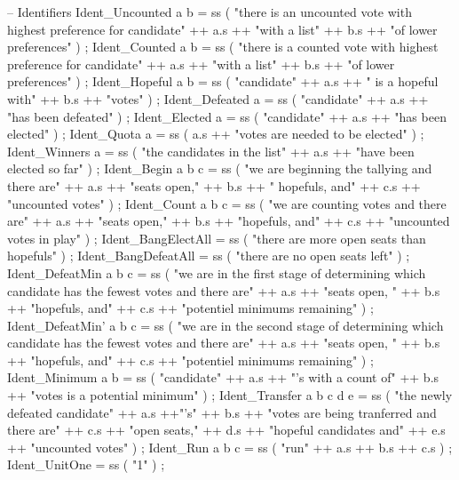 \begin{lstgf}
{        -- Identifiers
        Ident_Uncounted a b
            = ss ( "there is an uncounted vote with highest preference for candidate" ++ a.s ++ "with 
                      a list" ++ b.s ++ "of lower preferences" ) ;
        Ident_Counted a b
            = ss ( "there is a counted vote with highest preference for candidate" ++ a.s ++ "with a 
                      list" ++ b.s ++ "of lower preferences" ) ;
        Ident_Hopeful a b
            = ss ( "candidate" ++ a.s ++ " is a hopeful with" ++ b.s ++ "votes" ) ;
        Ident_Defeated a
            = ss ( "candidate" ++ a.s ++ "has been defeated" ) ;
        Ident_Elected a
            = ss ( "candidate" ++ a.s ++ "has been elected" ) ;
        Ident_Quota a
            = ss ( a.s ++ "votes are needed to be elected" ) ;
        Ident_Winners a
            = ss ( "the candidates in the list" ++ a.s ++ "have been elected so far" ) ;
        Ident_Begin a b c
            = ss ( "we are beginning the tallying and there are" ++ a.s ++ "seats open," ++ b.s 
                      ++ " hopefuls, and" ++ c.s ++ "uncounted votes" ) ;
        Ident_Count a b c
            = ss ( "we are counting votes and there are" ++ a.s ++ "seats open," ++ b.s ++ "hopefuls, 
                      and" ++ c.s ++ "uncounted votes in play" ) ;
        Ident_BangElectAll
            = ss ( "there are more open seats than hopefuls" ) ;
        Ident_BangDefeatAll              
            = ss ( "there are no open seats left" ) ;
        Ident_DefeatMin a b c
            = ss ( "we are in the first stage of determining which candidate has the fewest votes and 
                      there are" ++ a.s ++ "seats open, " ++ b.s ++ "hopefuls, and" ++ c.s ++ "potentiel 
                      minimums remaining" ) ;
        Ident_DefeatMin' a b c
            = ss ( "we are in the second stage of determining which candidate has the fewest votes and 
                      there are" ++ a.s ++ "seats open, " ++ b.s ++ "hopefuls, and" ++ c.s ++ "potentiel 
                      minimums remaining" ) ;
        Ident_Minimum a b
            = ss ( "candidate" ++ a.s ++ "'s with a count of" ++ b.s ++ "votes is a potential minimum" ) ;
        Ident_Transfer a b c d e
            = ss ( "the newly defeated candidate" ++ a.s ++"'s" ++ b.s ++ "votes are being tranferred and 
                      there are" ++ c.s ++ "open seats," ++ d.s ++ "hopeful candidates and" ++ e.s ++ "uncounted 
                      votes" ) ;
        Ident_Run a b c
            = ss ( "run" ++ a.s ++ b.s ++ c.s ) ;
        Ident_UnitOne                   
            = ss ( "1" ) ;

}
\end{lstgf}
